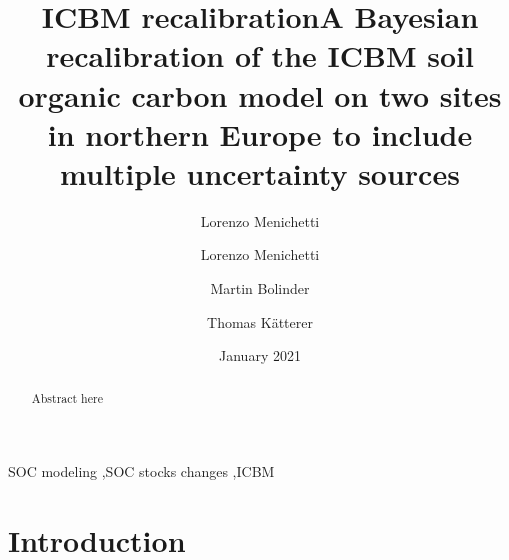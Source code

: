 \documentclass[review]{elsarticle}
\title{ICBM recalibration}
\author{Lorenzo Menichetti}
\date{January 2021}
\begin{document}
\begin{frontmatter}

\title{A Bayesian recalibration of the ICBM soil organic carbon model on two sites in northern Europe to include multiple uncertainty sources}

\author[SLU_ecology]{Lorenzo Menichetti}
\author[SLU_ecology]{Martin Bolinder}
\author[SLU_ecology]{Thomas K{\"a}tterer}


\address[SLU_ecology]{Department of Ecology, Swedish University of Agricultural Sciences (SLU), Uppsala, 75007, Sweden}


\begin{abstract}
Abstract here
\end{abstract}

\begin{keyword}
SOC modeling \sep SOC stocks changes \sep ICBM
\end{keyword}

\end{frontmatter}

\linenumbers


\section{Introduction}
\end{document}
